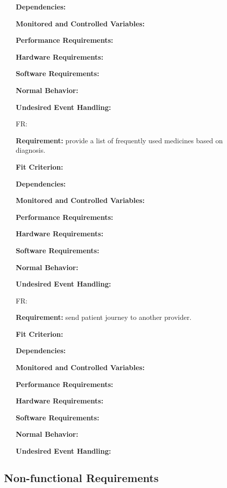 \documentclass[12pt]{article}
\newcounter{reqnum} %
\begin{document}
\begin{itemize}
\textbf{Dependencies:}  

\textbf{Monitored and Controlled Variables:} 

\textbf{Performance Requirements:} 

\textbf{Hardware Requirements:} 

\textbf{Software Requirements:} 

\textbf{Normal Behavior:} 

\textbf{Undesired Event Handling:} 

\item[FR\refstepcounter{reqnum}\thereqnum \label{FR_meaningfulLabel}:] 

\textbf{Requirement:} provide a list of frequently used medicines based on diagnosis.

\textbf{Fit Criterion:}  

\textbf{Dependencies:}  

\textbf{Monitored and Controlled Variables:} 

\textbf{Performance Requirements:} 

\textbf{Hardware Requirements:} 

\textbf{Software Requirements:} 

\textbf{Normal Behavior:} 

\textbf{Undesired Event Handling:} 

\item[FR\refstepcounter{reqnum}\thereqnum \label{FR_meaningfulLabel}:] 

\textbf{Requirement:} send patient journey to another provider.

\textbf{Fit Criterion:}  

\textbf{Dependencies:}  

\textbf{Monitored and Controlled Variables:} 

\textbf{Performance Requirements:} 

\textbf{Hardware Requirements:} 

\textbf{Software Requirements:} 

\textbf{Normal Behavior:} 

\textbf{Undesired Event Handling:} 

\end{itemize}


\subsection{Non-functional Requirements} \label{sec_NonFunctionalRequirements}
\end{document}
